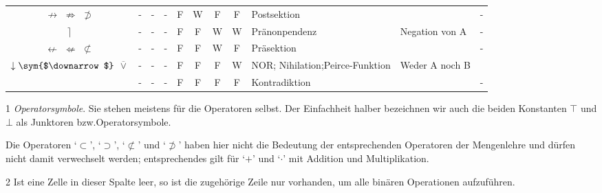 \documentclass[english,ngerman,parskip=half,headsepline,footsepline,
	fleqn,notitlepage]{scrreprt}
\makeatletter
\newcommand*{\texttrue}{W}%
\newcommand*{\textfalse}{F}%
\newcommand*{\ltrue}{\top}%
\newcommand*{\lfalse}{\bot}%
\newcommand*{\lnimp}{\nrightarrow}%
\newcommand*{\lnimpA}{\nRightarrow}%
\newcommand*{\lnimpB}{\nsupset}%
\newcommand*{\lnleft}{\rceil}%
\newcommand*{\lnrep}{\nleftarrow}%
\newcommand*{\lnrepA}{\nLeftarrow}%
\newcommand*{\lnrepB}{\nsubset}%
\newcommand*{\lnor}{\downarrow}%
\newcommand*{\lnorA}{\operatorname{\overline\vee}}%
\newcommand*{\charqt}[1]{\enquote*{#1}}%
\newcommand*{\symqt}[1]{\charqt{#1}}%
\newcommand*{\textbzw}{bzw.\@ }
\newcommand*{\Sym}[1]{#1\sym{$#1$}}%
\makeatother
\begin{document}
\begin{table}
\begin{threeparttable}
\begin{tabularx}{\linewidth-10.95pt}{c||c:cc:cccc|X:X|c|}
				\tableline%

				$\lnimp$ $\lnimpA$ $\lnimpB$
				& - & - & - &\textfalse&\texttrue&\textfalse&\textfalse
				& Postsektion
				&
				& - \\

				\tablegroup%

				$\lnleft$
				& - & - & - &\textfalse&\textfalse&\texttrue&\texttrue
				& Pränonpendenz
				& Negation von A
				& - \\

				\tableline%

				$\lnrep$ $\lnrepA$ $\lnrepB$
				& - & - & - &\textfalse&\textfalse&\texttrue&\textfalse
				& Präsektion
				&
				& - \\

				\tableline%

				$\Sym{\lnor}$ $\lnorA$
				& - & - & - &\textfalse&\textfalse&\textfalse&\texttrue
				& NOR; Nihilation;\newline Peirce-Funktion
				& Weder A noch B
				& \thepnor \\

				\tableline%

				~
				& - & - & - &\textfalse&\textfalse&\textfalse&\textfalse
				& Kontradiktion
				&
				& - \\

				\hline%
			\end{tabularx}
			\begin{tablenotes}
				\footnotesize

				\item[1] \emph{Operatorsymbole}. Sie stehen meistens für die Operatoren selbst.
				Der Einfachheit halber bezeichnen wir auch die beiden Konstanten
				$\ltrue$ und $\lfalse$ als Junktoren \textbzw Operatorsymbole.

				Die Operatoren \symqt{$\subset$}, \symqt{$\supset$},
				\symqt{$\nsubset$} und \symqt{$\nsupset$} haben hier nicht die
				Bedeutung der entsprechenden Operatoren der Mengenlehre
				und dürfen nicht damit verwechselt werden;
				entsprechendes gilt für \symqt{$+$} und \symqt{$\cdot$}
				mit Addition und Multiplikation.

				\item[2] Ist eine Zelle in dieser Spalte leer,
				so ist die zugehörige Zeile nur vorhanden,
				um alle binären Operationen aufzuführen.


\end{tablenotes}
\end{threeparttable}
\end{table}
\end{document}
